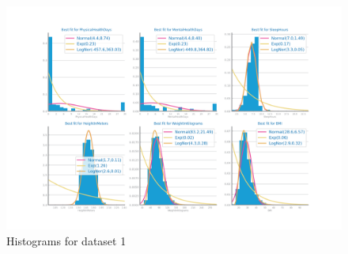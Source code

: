 \documentclass[10pt]{extarticle}
\begin{document}
\begin{figure}[H]
\centering\includegraphics[scale=0.6]{images/dataset1/data_profiling/CovidPos_histogram_numeric_distribution.png}
\caption{Histograms for dataset 1} %
\end{figure}
\end{document}
